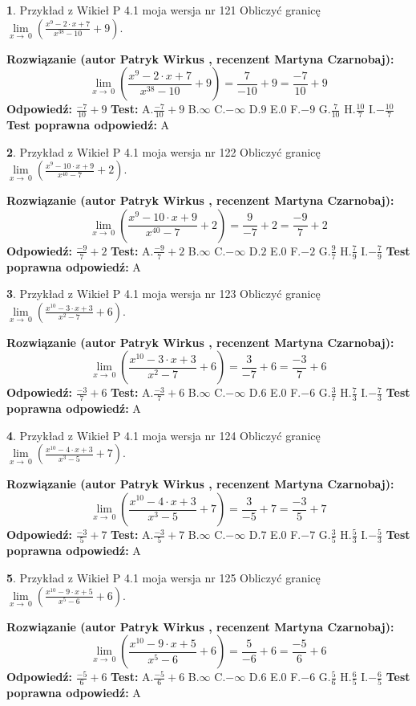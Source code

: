 \documentclass[12pt, a4paper]{article}
\theoremstyle{definition} %
\newtheorem{zad}{}
\newcommand{\zadStart}[1]{\begin{zad}#1\newline}
\newcommand{\zadStop}{\end{zad}}
\newcommand{\rozwStart}[2]{\noindent \textbf{Rozwiązanie (autor #1 , recenzent #2): }\newline}
\newcommand{\rozwStop}{\newline}
\newcommand{\odpStart}{\noindent \textbf{Odpowiedź:}\newline}
\newcommand{\odpStop}{\newline}
\newcommand{\testStart}{\noindent \textbf{Test:}\newline}
\newcommand{\testStop}{\newline}
\newcommand{\kluczStart}{\noindent \textbf{Test poprawna odpowiedź:}\newline}
\newcommand{\kluczStop}{\newline}
\begin{document}
\zadStart{Przykład z Wikieł P 4.1 moja wersja nr 121}
Obliczyć granicę $\lim\limits_{x\to\ 0}(\frac{x^{9}-2 \cdot x +7}{x^{38}-10}+9)$.
\zadStop
\rozwStart{Patryk Wirkus}{Martyna Czarnobaj}
$$\lim\limits_{x\to\ 0}(\frac{x^{9}-2 \cdot x +7}{x^{38}-10}+9)=\frac{7}{-10}+9=\frac{-7}{10}+9$$
\rozwStop
\odpStart
$\frac{-7}{10}+9$
\odpStop
\testStart
A.$\frac{-7}{10}+9$
B.$\infty$
C.$-\infty$
D.$9$
E.$0$
F.$-9$
G.$\frac{7}{10}$
H.$\frac{10}{7}$
I.$-\frac{10}{7}$
\testStop
\kluczStart
A
\kluczStop



\zadStart{Przykład z Wikieł P 4.1 moja wersja nr 122}
Obliczyć granicę $\lim\limits_{x\to\ 0}(\frac{x^{9}-10 \cdot x +9}{x^{40}-7}+2)$.
\zadStop
\rozwStart{Patryk Wirkus}{Martyna Czarnobaj}
$$\lim\limits_{x\to\ 0}(\frac{x^{9}-10 \cdot x +9}{x^{40}-7}+2)=\frac{9}{-7}+2=\frac{-9}{7}+2$$
\rozwStop
\odpStart
$\frac{-9}{7}+2$
\odpStop
\testStart
A.$\frac{-9}{7}+2$
B.$\infty$
C.$-\infty$
D.$2$
E.$0$
F.$-2$
G.$\frac{9}{7}$
H.$\frac{7}{9}$
I.$-\frac{7}{9}$
\testStop
\kluczStart
A
\kluczStop



\zadStart{Przykład z Wikieł P 4.1 moja wersja nr 123}
Obliczyć granicę $\lim\limits_{x\to\ 0}(\frac{x^{10}-3 \cdot x +3}{x^{2}-7}+6)$.
\zadStop
\rozwStart{Patryk Wirkus}{Martyna Czarnobaj}
$$\lim\limits_{x\to\ 0}(\frac{x^{10}-3 \cdot x +3}{x^{2}-7}+6)=\frac{3}{-7}+6=\frac{-3}{7}+6$$
\rozwStop
\odpStart
$\frac{-3}{7}+6$
\odpStop
\testStart
A.$\frac{-3}{7}+6$
B.$\infty$
C.$-\infty$
D.$6$
E.$0$
F.$-6$
G.$\frac{3}{7}$
H.$\frac{7}{3}$
I.$-\frac{7}{3}$
\testStop
\kluczStart
A
\kluczStop



\zadStart{Przykład z Wikieł P 4.1 moja wersja nr 124}
Obliczyć granicę $\lim\limits_{x\to\ 0}(\frac{x^{10}-4 \cdot x +3}{x^{3}-5}+7)$.
\zadStop
\rozwStart{Patryk Wirkus}{Martyna Czarnobaj}
$$\lim\limits_{x\to\ 0}(\frac{x^{10}-4 \cdot x +3}{x^{3}-5}+7)=\frac{3}{-5}+7=\frac{-3}{5}+7$$
\rozwStop
\odpStart
$\frac{-3}{5}+7$
\odpStop
\testStart
A.$\frac{-3}{5}+7$
B.$\infty$
C.$-\infty$
D.$7$
E.$0$
F.$-7$
G.$\frac{3}{5}$
H.$\frac{5}{3}$
I.$-\frac{5}{3}$
\testStop
\kluczStart
A
\kluczStop



\zadStart{Przykład z Wikieł P 4.1 moja wersja nr 125}
Obliczyć granicę $\lim\limits_{x\to\ 0}(\frac{x^{10}-9 \cdot x +5}{x^{5}-6}+6)$.
\zadStop
\rozwStart{Patryk Wirkus}{Martyna Czarnobaj}
$$\lim\limits_{x\to\ 0}(\frac{x^{10}-9 \cdot x +5}{x^{5}-6}+6)=\frac{5}{-6}+6=\frac{-5}{6}+6$$
\rozwStop
\odpStart
$\frac{-5}{6}+6$
\odpStop
\testStart
A.$\frac{-5}{6}+6$
B.$\infty$
C.$-\infty$
D.$6$
E.$0$
F.$-6$
G.$\frac{5}{6}$
H.$\frac{6}{5}$
I.$-\frac{6}{5}$
\testStop
\kluczStart
A
\kluczStop
\end{document}
